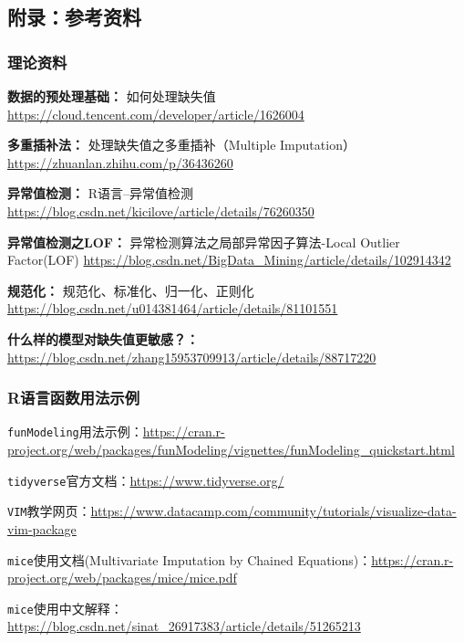 \documentclass[]{ctexbook}
\newcommand{\passthrough}[1]{#1}
\begin{document}
\hypertarget{ux9644ux5f55ux53c2ux8003ux8d44ux6599}{%
\subsection*{附录：参考资料}\label{ux9644ux5f55ux53c2ux8003ux8d44ux6599}}


\hypertarget{ux7406ux8bbaux8d44ux6599}{%
\subsubsection*{理论资料}\label{ux7406ux8bbaux8d44ux6599}}


\textbf{数据的预处理基础：} 如何处理缺失值 \url{https://cloud.tencent.com/developer/article/1626004}

\textbf{多重插补法：} 处理缺失值之多重插补（Multiple Imputation）\url{https://zhuanlan.zhihu.com/p/36436260}

\textbf{异常值检测：} R语言--异常值检测 \url{https://blog.csdn.net/kicilove/article/details/76260350}

\textbf{异常值检测之LOF：} 异常检测算法之局部异常因子算法-Local Outlier Factor(LOF) \url{https://blog.csdn.net/BigData_Mining/article/details/102914342}

\textbf{规范化：} 规范化、标准化、归一化、正则化 \url{https://blog.csdn.net/u014381464/article/details/81101551}

\textbf{什么样的模型对缺失值更敏感？：} \url{https://blog.csdn.net/zhang15953709913/article/details/88717220}

\hypertarget{rux8bedux8a00ux51fdux6570ux7528ux6cd5ux793aux4f8b}{%
\subsubsection*{R语言函数用法示例}\label{rux8bedux8a00ux51fdux6570ux7528ux6cd5ux793aux4f8b}}


\passthrough{\lstinline!funModeling!}用法示例：\url{https://cran.r-project.org/web/packages/funModeling/vignettes/funModeling_quickstart.html}

\passthrough{\lstinline!tidyverse!}官方文档：\url{https://www.tidyverse.org/}

\passthrough{\lstinline!VIM!}教学网页：\url{https://www.datacamp.com/community/tutorials/visualize-data-vim-package}

\passthrough{\lstinline!mice!}使用文档(Multivariate Imputation by Chained Equations)：\url{https://cran.r-project.org/web/packages/mice/mice.pdf}

\passthrough{\lstinline!mice!}使用中文解释：\url{https://blog.csdn.net/sinat_26917383/article/details/51265213}
\end{document}
